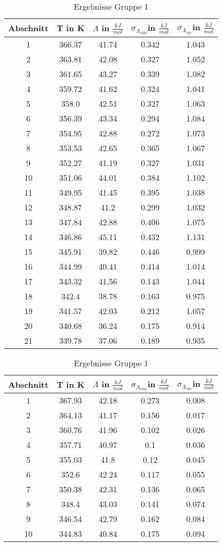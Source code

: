 \documentclass{article}
\begin{document}
\begin{table}[H]\centering
\caption{Ergebnisse Gruppe 1}

\begin{tabular}{c|c|c|c|c}
Abschnitt&T in K&$\Lambda$ in $\frac{kJ}{mol}$&$\sigma_{\Lambda_{stat}}$in $\frac{kJ}{mol}$&$\sigma_{\Lambda_{sys}}$in $\frac{kJ}{mol}$\\
\hline
1&366.37&41.74&0.342&1.043\\
2&363.81&42.08&0.327&1.052\\
3&361.65&43.27&0.339&1.082\\
4&359.72&41.62&0.324&1.041\\
5&358.0&42.51&0.327&1.063\\
6&356.39&43.34&0.294&1.084\\
7&354.95&42.88&0.272&1.073\\
8&353.53&42.65&0.365&1.067\\
9&352.27&41.19&0.327&1.031\\
10&351.06&44.01&0.384&1.102\\
11&349.95&41.45&0.395&1.038\\
12&348.87&41.2&0.299&1.032\\
13&347.84&42.88&0.406&1.075\\
14&346.86&45.11&0.432&1.131\\
15&345.91&39.82&0.446&0.999\\
16&344.99&40.41&0.414&1.014\\
17&343.32&41.56&0.143&1.044\\
18&342.4&38.78&0.163&0.975\\
19&341.57&42.03&0.212&1.057\\
20&340.68&36.24&0.175&0.914\\
21&339.78&37.06&0.189&0.935\\
\end{tabular}
\end{table}
\begin{table}[H]\centering
\caption{Ergebnisse Gruppe 1}

\begin{tabular}{c|c|c|c|c}
Abschnitt&T in K&$\Lambda$ in $\frac{kJ}{mol}$&$\sigma_{\Lambda_{stat}}$in $\frac{kJ}{mol}$&$\sigma_{\Lambda_{sys}}$in $\frac{kJ}{mol}$\\
\hline
1&367.93&42.18&0.273&0.008\\
2&364.13&41.17&0.156&0.017\\
3&360.76&41.96&0.102&0.026\\
4&357.71&40.97&0.1&0.036\\
5&355.03&41.8&0.12&0.045\\
6&352.6&42.24&0.117&0.055\\
7&350.38&42.31&0.136&0.065\\
8&348.4&43.03&0.141&0.074\\
9&346.54&42.79&0.162&0.084\\
10&344.83&40.84&0.175&0.094\\
\end{tabular}
\end{table}
\end{document}
